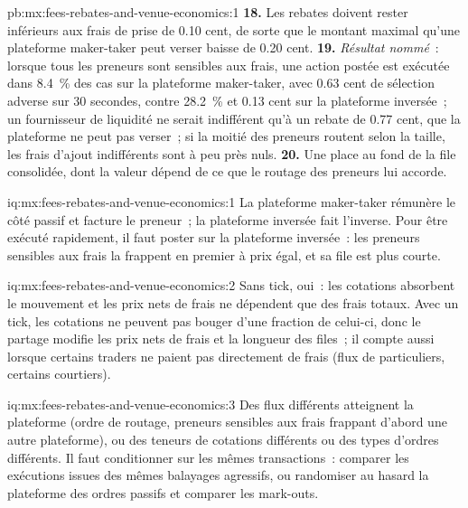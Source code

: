 \begin{solution}{pb:mx:fees-rebates-and-venue-economics:1}
\textbf{18.} Les rebates doivent rester inférieurs aux frais de prise de 0.10 cent, de sorte que le montant maximal qu'une plateforme maker-taker peut verser baisse de 0.20 cent.
\textbf{19.} \emph{Résultat nommé}~: lorsque tous les preneurs sont sensibles aux frais, une action postée est exécutée dans 8.4~\% des cas sur la plateforme maker-taker, avec 0.63 cent de
sélection adverse sur 30 secondes, contre 28.2~\% et 0.13 cent sur la plateforme inversée~; un fournisseur de liquidité ne serait indifférent qu'à un rebate de 0.77 cent, que la plateforme ne peut pas
verser~; si la moitié des preneurs routent selon la taille, les frais d'ajout indifférents sont à peu près nuls.
\textbf{20.} Une place au fond de la file consolidée, dont la valeur dépend de ce que le routage des preneurs lui accorde.
\end{solution}

\begin{solution}{iq:mx:fees-rebates-and-venue-economics:1}
La plateforme maker-taker rémunère le côté passif et facture le preneur~; la plateforme inversée fait l'inverse. Pour être exécuté rapidement, il faut poster sur la plateforme inversée~: les preneurs sensibles aux frais
la frappent en premier à prix égal, et sa file est plus courte.
\end{solution}

\begin{solution}{iq:mx:fees-rebates-and-venue-economics:2}
Sans tick, oui~: les cotations absorbent le mouvement et les prix nets de frais ne dépendent que des frais totaux. Avec un tick, les cotations ne peuvent pas bouger d'une fraction de celui-ci, donc
le partage modifie les prix nets de frais et la longueur des files~; il compte aussi lorsque certains traders ne paient pas directement de frais (flux de particuliers, certains courtiers).
\end{solution}

\begin{solution}{iq:mx:fees-rebates-and-venue-economics:3}
Des flux différents atteignent la plateforme (ordre de routage, preneurs sensibles aux frais frappant d'abord une autre plateforme), ou des teneurs de cotations différents ou des types d'ordres différents. Il faut conditionner sur les
mêmes transactions~: comparer les exécutions issues des mêmes balayages agressifs, ou randomiser au hasard la plateforme des ordres passifs et comparer les mark-outs.
\end{solution}


